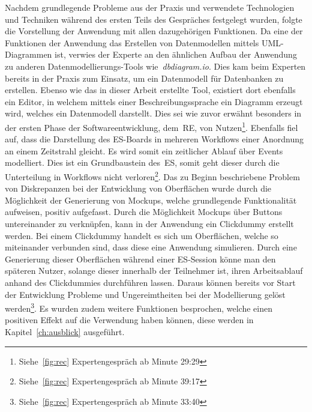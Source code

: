 Nachdem grundlegende Probleme aus der Praxis und verwendete Technologien und Techniken während des ersten Teils des Gespräches festgelegt wurden,
folgte die Vorstellung der Anwendung mit allen dazugehörigen Funktionen.
Da eine der Funktionen der Anwendung das Erstellen von Datenmodellen mittels UML-Diagrammen ist, verwies der Experte an den ähnlichen Aufbau der Anwendung
zu anderen Datenmodellierungs-Tools wie~\textit{dbdiagram.io}.
Dies kam beim Experten bereits in der Praxis zum Einsatz, um ein Datenmodell für Datenbanken zu erstellen.
Ebenso wie das in dieser Arbeit erstellte Tool, existiert dort ebenfalls ein Editor, in welchem mittels einer Beschreibungssprache ein Diagramm erzeugt wird,
welches ein Datenmodell darstellt.
Dies sei wie zuvor erwähnt besonders in der ersten Phase der Softwareentwicklung, dem~\ac{RE}, von Nutzen\footnote{Siehe~\ref{fig:rec} Expertengespräch ab Minute  29:29}.\newline
Ebenfalls fiel auf, dass die Darstellung des \ac{ES}-Boards in mehreren Workflows einer Anordnung an einem Zeitstrahl gleicht.
Es wird somit ein zeitlicher Ablauf über Events modelliert.
Dies ist ein Grundbaustein des~\ac{ES}, somit geht dieser durch die Unterteilung in Workflows nicht verloren\footnote{Siehe~\ref{fig:rec} Expertengespräch ab Minute  39:17}.\newline
Das zu Beginn beschriebene Problem von Diskrepanzen bei der Entwicklung von Oberflächen wurde durch die Möglichkeit der Generierung von
Mockups, welche grundlegende Funktionalität aufweisen, positiv aufgefasst.
Durch die Möglichkeit Mockups über Buttons untereinander zu verknüpfen, kann in der Anwendung ein Clickdummy erstellt werden.
Bei einem Clickdummy handelt es sich um Oberflächen, welche so miteinander verbunden sind, dass diese eine Anwendung simulieren.
Durch eine Generierung dieser Oberflächen während einer \ac{ES}-Session könne man den späteren Nutzer, solange dieser innerhalb der Teilnehmer ist,
ihren Arbeitsablauf anhand des Clickdummies durchführen lassen.
Daraus können bereits vor Start der Entwicklung Probleme und Ungereimtheiten bei der Modellierung gelöst werden\footnote{Siehe~\ref{fig:rec} Expertengespräch ab Minute  33:40}.\newline
Es wurden zudem weitere Funktionen besprochen, welche einen positiven Effekt auf die Verwendung haben können, diese werden in Kapitel~\ref{ch:ausblick} ausgeführt.
